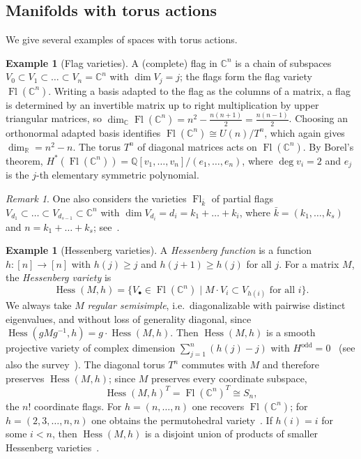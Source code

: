 \documentclass[11pt,a4paper]{article}
\numberwithin{equation}{section}
\theoremstyle{plain}
\theoremstyle{definition}
\newtheorem{example}[theorem]{Example}
\theoremstyle{remark}
\newtheorem{remark}[theorem]{Remark}
\newcommand{\Q}{\mathbb{Q}}
\newcommand{\R}{\mathbb{R}}
\newcommand{\C}{\mathbb{C}}
\DeclareMathOperator{\Fl}{Fl}
\DeclareMathOperator{\Hess}{Hess}
\begin{document}
\subsection{Manifolds with torus actions}\label{sec:examples}

We give several examples of spaces with torus actions.

\begin{example}[Flag varieties]
A (complete) flag in $\C^n$ is a chain of subspaces $V_0\subset V_1\subset\dots\subset V_n=\C^n$ with $\dim V_j=j$; the flags form the flag variety $\Fl(\C^n)$. Writing a basis adapted to the flag as the columns of a matrix, a flag is determined by an invertible matrix up to right multiplication by upper triangular matrices, so $\dim_\C\Fl(\C^n)=n^2-\frac{n(n+1)}2=\frac{n(n-1)}2$. Choosing an orthonormal adapted basis identifies $\Fl(\C^n)\cong U(n)/T^n$, which again gives $\dim_\R=n^2-n$. The torus $T^n$ of diagonal matrices acts on $\Fl(\C^n)$. By Borel's theorem, $H^*(\Fl(\C^n))=\Q[v_1,\dots,v_n]/(e_1,\dots,e_n)$, where $\deg v_i=2$ and $e_j$ is the $j$-th elementary symmetric polynomial.
\end{example}

\begin{remark}
One also considers the varieties $\Fl_{\bar k}$ of partial flags $V_{d_1}\subset\dots\subset V_{d_{s-1}}\subset\C^n$ with $\dim V_{d_i}=d_i=k_1+\dots+k_i$, where $\bar k=(k_1,\dots,k_s)$ and $n=k_1+\dots+k_s$; see~\cite[§5.2]{AB24}.
\end{remark}

\begin{example}[Hessenberg varieties]\label{ex:hessenberg}
A \emph{Hessenberg function} is a function $h\colon[n]\to[n]$ with $h(j)\geqslant j$ and $h(j+1)\geqslant h(j)$ for all $j$. For a matrix $M$, the \emph{Hessenberg variety} is
\[
\Hess(M,h)=\{V_\bullet\in\Fl(\C^n)\mid M\cdot V_i\subset V_{h(i)}\text{ for all }i\}.
\]
We always take $M$ \emph{regular semisimple}, i.e.\ diagonalizable with pairwise distinct eigenvalues, and without loss of generality diagonal, since $\Hess(gMg^{-1},h)=g\cdot\Hess(M,h)$. Then $\Hess(M,h)$ is a smooth projective variety of complex dimension $\sum_{j=1}^n(h(j)-j)$ with $H^{\mathrm{odd}}=0$~\cite{DPS92} (see also the survey~\cite{AH20}). The diagonal torus $T^n$ commutes with $M$ and therefore preserves $\Hess(M,h)$; since $M$ preserves every coordinate subspace,
\[
\Hess(M,h)^T=\Fl(\C^n)^T\cong S_n,
\]
the $n!$ coordinate flags. For $h=(n,\dots,n)$ one recovers $\Fl(\C^n)$; for $h=(2,3,\dots,n,n)$ one obtains the permutohedral variety~\cite{AB21}. If $h(i)=i$ for some $i<n$, then $\Hess(M,h)$ is a disjoint union of products of smaller Hessenberg varieties~\cite[§3]{AB21}.
\end{example}
\end{document}
